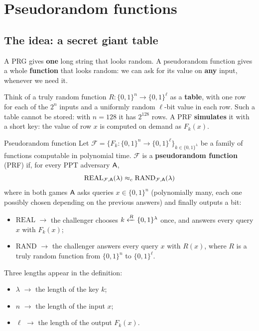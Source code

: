
\section{Pseudorandom functions}

\subsection{The idea: a secret giant table}

A PRG gives \textbf{one} long string that looks random. A pseudorandom function gives a whole \textbf{function} that looks random: we can ask for its value on \textbf{any} input, whenever we need it.

Think of a truly random function $R : \{0,1\}^n \to \{0,1\}^\ell$ as a \textbf{table}, with one row for each of the $2^n$ inputs and a uniformly random $\ell$-bit value in each row. Such a table cannot be stored: with $n = 128$ it has $2^{128}$ rows. A PRF \textbf{simulates} it with a short key: the value of row $x$ is computed on demand as $F_k(x)$.

\begin{frameddefn}[label={def:prf}]{Pseudorandom function}
  Let $\mathcal{F} = \{F_k : \{0,1\}^n \to \{0,1\}^\ell\}_{k \in \{0,1\}^\lambda}$ be a family of functions computable in polynomial time. $\mathcal{F}$ is a \textbf{pseudorandom function} (PRF) if, for every PPT adversary $\mathsf{A}$,
  \[
    \mathrm{REAL}_{\mathcal{F},\mathsf{A}}(\lambda) \approx_c \mathrm{RAND}_{\mathcal{F},\mathsf{A}}(\lambda)
  \]
  where in both games $\mathsf{A}$ asks queries $x \in \{0,1\}^n$ (polynomially many, each one possibly chosen depending on the previous answers) and finally outputs a bit:
  \begin{itemize}
    \item \textbf{$\mathrm{REAL}$} $\to$ the challenger chooses $k \xleftarrow{R} \{0,1\}^\lambda$ once, and answers every query $x$ with $F_k(x)$;
    \item \textbf{$\mathrm{RAND}$} $\to$ the challenger answers every query $x$ with $R(x)$, where $R$ is a truly random function from $\{0,1\}^n$ to $\{0,1\}^\ell$.
  \end{itemize}
\end{frameddefn}

Three lengths appear in the definition:
\begin{itemize}
  \item \textbf{$\lambda$} $\to$ the length of the key $k$;
  \item \textbf{$n$} $\to$ the length of the input $x$;
  \item \textbf{$\ell$} $\to$ the length of the output $F_k(x)$.
\end{itemize}

